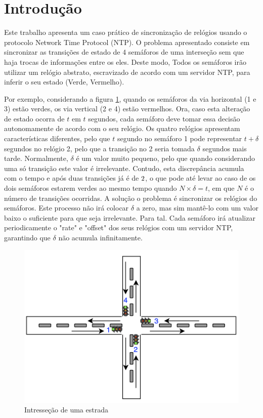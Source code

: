 \section{Introdução}


    Este trabalho apresenta um caso prático de sincronização de relógios usando o protocolo Network Time Protocol (NTP). O problema apresentado consiste em sincronizar as transições de estado de 4 semáforos de uma interseção sem que haja trocas de informações entre os eles. Deste modo, Todos os semáforos irão utilizar um relógio abstrato, escravizado de acordo com um servidor NTP, para inferir o seu estado (Verde, Vermelho).
    
    Por exemplo, considerando a figura \ref{fig:diagramaEstrada}, quando os semáforos da via horizontal (1 e 3) estão verdes, os via vertical (2 e 4) estão vermelhos. Ora, caso esta alteração de estado ocorra de $t$ em $t$ segundos, cada semáforo deve tomar essa decisão autonomamente de acordo com o seu relógio.
    Os quatro relógios apresentam características diferentes, pelo que $t$ segundo no semáforo 1 pode representar $t + \delta$ segundos no relógio 2, pelo que a transição no 2 seria tomada $\delta$ segundos mais tarde. Normalmente, $\delta$ é um valor muito pequeno, pelo que quando considerando uma só transição este valor é irrelevante. Contudo, esta discrepância acumula com o tempo e após duas transições já é de $2 \time \delta$, o que pode até levar ao caso de os dois semáforos estarem verdes ao mesmo tempo quando $N \times \delta = t$, em que $N$ é o número de transições ocorridas.
    A solução o problema é sincronizar os relógios do semáforos. Este processo não irá colocar $\delta$ a zero, mas sim mantê-lo com um valor baixo o suficiente para que seja irrelevante. Para tal. Cada semáforo irá atualizar periodicamente o "rate" e "offset" dos seus relógios com um servidor NTP, garantindo que $\delta$ não acumula infinitamente.  
    
    \begin{figure}[h]
        \centering
        \includegraphics[width=0.8\linewidth]{figures/diagramaEstrada.png}
        \caption{Intresseção de uma estrada}
        \label{fig:diagramaEstrada}
    \end{figure}